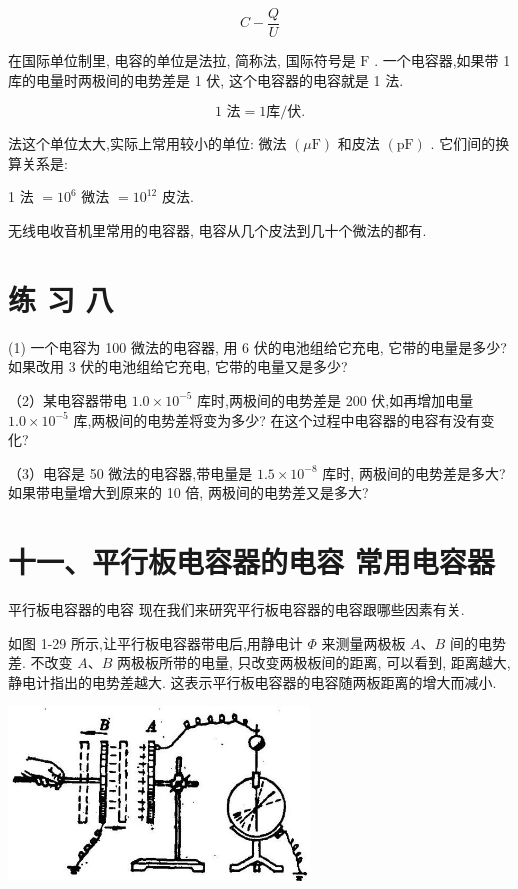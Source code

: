 \documentclass[10pt]{article}
\begin{document}
\[
C - \frac{Q}{U}
\]

在国际单位制里, 电容的单位是法拉, 简称法, 国际符号是 \(\mathrm{F}\) . 一个电容器,如果带 1 库的电量时两极间的电势差是 1 伏, 这个电容器的电容就是 1 法.

\[
\text{1 法} = 1\text{库/伏.}
\]

法这个单位太大,实际上常用较小的单位: 微法 \(\left( {\mu \mathrm{F}}\right)\) 和皮法 \(\left( \mathrm{{pF}}\right)\) . 它们间的换算关系是:

1 法 \(= {10}^{6}\) 微法 \(= {10}^{12}\) 皮法.

无线电收音机里常用的电容器, 电容从几个皮法到几十个微法的都有.

\section*{练 习 八}

(1) 一个电容为 100 微法的电容器, 用 6 伏的电池组给它充电, 它带的电量是多少? 如果改用 3 伏的电池组给它充电, 它带的电量又是多少?

（2）某电容器带电 \({1.0} \times {10}^{-5}\) 库时,两极间的电势差是 200 伏,如再增加电量 \({1.0} \times {10}^{-5}\) 库,两极间的电势差将变为多少? 在这个过程中电容器的电容有没有变化?

（3）电容是 50 微法的电容器,带电量是 \({1.5} \times {10}^{-8}\) 库时, 两极间的电势差是多大? 如果带电量增大到原来的 10 倍, 两极间的电势差又是多大?

\section*{十一、平行板电容器的电容 常用电容器}

平行板电容器的电容 现在我们来研究平行板电容器的电容跟哪些因素有关.

如图 1-29 所示,让平行板电容器带电后,用静电计 \(\Phi\) 来测量两极板 \(A\text{、}B\) 间的电势差. 不改变 \(A\text{、}B\) 两极板所带的电量, 只改变两极板间的距离, 可以看到, 距离越大, 静电计指出的电势差越大. 这表示平行板电容器的电容随两板距离的增大而减小.

\begin{center}
\includegraphics[max width=0.6\textwidth]{images/01913056-1f15-74d8-9184-9aab52c9d66b_45_420456.jpg}
\end{center}
\end{document}
